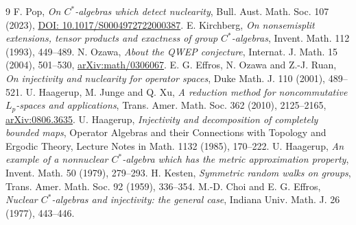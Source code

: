 \documentclass[11pt,a4paper]{article}
\begin{document}
\begin{thebibliography}{9}
\setlength{\itemsep}{2pt}
 F. Pop, \emph{On \(C^*\)-algebras which detect nuclearity}, Bull. Aust. Math. Soc. 107 (2023), \href{https://doi.org/10.1017/S0004972722000387}{DOI: 10.1017/S0004972722000387}.
 E. Kirchberg, \emph{On nonsemisplit extensions, tensor products and exactness of group \(C^*\)-algebras}, Invent. Math. 112 (1993), 449--489.
 N. Ozawa, \emph{About the QWEP conjecture}, Internat. J. Math. 15 (2004), 501--530, \href{https://arxiv.org/abs/math/0306067}{arXiv:math/0306067}.
 E. G. Effros, N. Ozawa and Z.-J. Ruan, \emph{On injectivity and nuclearity for operator spaces}, Duke Math. J. 110 (2001), 489--521.
 U. Haagerup, M. Junge and Q. Xu, \emph{A reduction method for noncommutative \(L_p\)-spaces and applications}, Trans. Amer. Math. Soc. 362 (2010), 2125--2165, \href{https://arxiv.org/abs/0806.3635}{arXiv:0806.3635}.
 U. Haagerup, \emph{Injectivity and decomposition of completely bounded maps}, Operator Algebras and their Connections with Topology and Ergodic Theory, Lecture Notes in Math. 1132 (1985), 170--222.
 U. Haagerup, \emph{An example of a nonnuclear \(C^*\)-algebra which has the metric approximation property}, Invent. Math. 50 (1979), 279--293.
 H. Kesten, \emph{Symmetric random walks on groups}, Trans. Amer. Math. Soc. 92 (1959), 336--354.
 M.-D. Choi and E. G. Effros, \emph{Nuclear \(C^*\)-algebras and injectivity: the general case}, Indiana Univ. Math. J. 26 (1977), 443--446.
\end{thebibliography}
\end{document}
